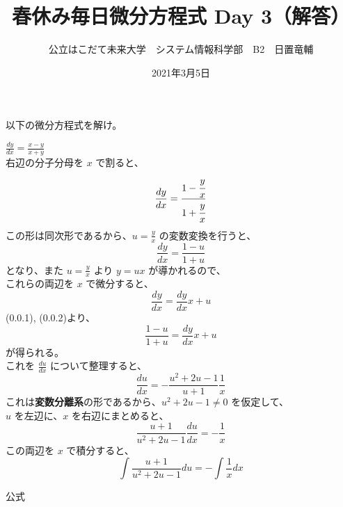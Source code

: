 \documentclass[dvipdfmx,uplatex]{jsarticle}
\title{春休み毎日微分方程式 Day 3（解答）}
\author{公立はこだて未来大学　システム情報科学部　B2　日置竜輔}
\date{2021年3月5日}
\begin{document}
\begin{spacing}{1.6}
\maketitle

以下の微分方程式を解け。
\begin{qparts}
    \qpart $ \displaystyle \frac{dy}{dx} = \frac{x - y}{x + y} $ \\

    右辺の分子分母を $ x $ で割ると、\\
    \begin{equation}
      \frac{dy}{dx} = \frac{1 - \cfrac{y}{x}}{1 + \cfrac{y}{x}} \nonumber
    \end{equation}
    この形は同次形であるから、$ \displaystyle u = \frac{y}{x} $ の変数変換を行うと、
    \begin{equation}
      \frac{dy}{dx} = \frac{1 - u}{1 + u}
    \end{equation}
    となり、また $ \displaystyle u = \frac{y}{x} $ より $ y = ux $ が導かれるので、\\
    これらの両辺を $ x $ で微分すると、\\
    \begin{equation}
      \frac{dy}{dx} = \frac{dy}{dx}x + u
    \end{equation}
    (0.0.1), (0.0.2)より、
    \begin{equation}
      \frac{1 - u}{1 + u} = \frac{dy}{dx}x + u \nonumber
    \end{equation}
    が得られる。\\
    これを $ \displaystyle \frac{du}{dx} $ について整理すると、\\
    \begin{equation}
      \frac{du}{dx} = - \frac{u ^ 2 + 2u - 1}{u + 1}\frac{1}{x} \nonumber
    \end{equation}
    これは{\bf 変数分離系}の形であるから、$ u ^ 2 + 2u - 1 \neq 0 $ を仮定して、\\
    $ u $ を左辺に、$ x $ を右辺にまとめると、
    \begin{equation}
      \frac{u + 1}{u ^ 2 + 2u - 1} \frac{du}{dx} = -\frac{1}{x} \nonumber
    \end{equation}
    この両辺を $ x $ で積分すると、
    \begin{equation}
      \int \frac{u + 1}{u ^ 2 + 2u - 1} du = - \int \frac{1}{x}dx
    \end{equation}
    \begin{itembox}{公式}

\end{itembox}
\end{qparts}
\end{spacing}
\end{document}
